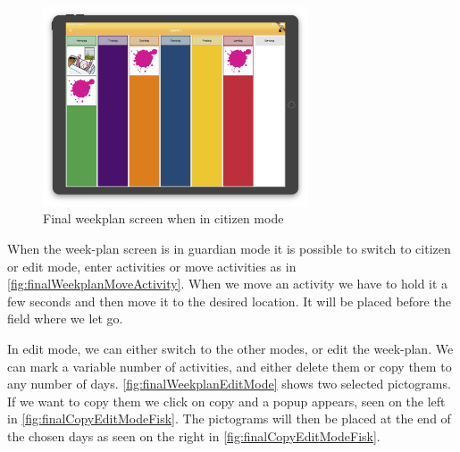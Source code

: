 \begin{figure}[H]
    \begin{center}
        \includegraphics[width=0.7\textwidth]{figures/FinalScreen/weekplanScreenCitizenMode.png}
    \end{center}
    \caption{Final weekplan screen when in citizen mode}
    \label{fig:finalWeekplanCitizenMode}
\end{figure}

When the week-plan screen is in \gls{guardian} mode it is possible to switch to \gls{citizen} or edit mode, enter activities or move activities as in \autoref{fig:finalWeekplanMoveActivity}. When we move an activity we have to hold it a few seconds and then move it to the desired location. It will be placed before the field where we let go.

In edit mode, we can either switch to the other modes, or edit the week-plan. We can mark a variable number of activities, and either delete them or copy them to any number of days. \autoref{fig:finalWeekplanEditMode} shows two selected pictograms. If we want to copy them we click on copy and a popup appears, seen on the left in \autoref{fig:finalCopyEditModeFisk}. The pictograms will then be placed at the end of the chosen days as seen on the right in \autoref{fig:finalCopyEditModeFisk}.

